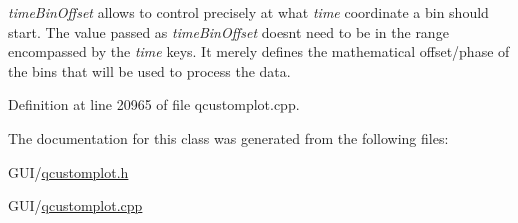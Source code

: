 {\itshape time\+Bin\+Offset} allows to control precisely at what {\itshape time} coordinate a bin should start. The value passed as {\itshape time\+Bin\+Offset} doesn\textquotesingle{}t need to be in the range encompassed by the {\itshape time} keys. It merely defines the mathematical offset/phase of the bins that will be used to process the data. 

Definition at line 20965 of file qcustomplot.\+cpp.



The documentation for this class was generated from the following files\+:\begin{DoxyCompactItemize}
\item 
G\+U\+I/\hyperlink{qcustomplot_8h}{qcustomplot.\+h}\item 
G\+U\+I/\hyperlink{qcustomplot_8cpp}{qcustomplot.\+cpp}\end{DoxyCompactItemize}
